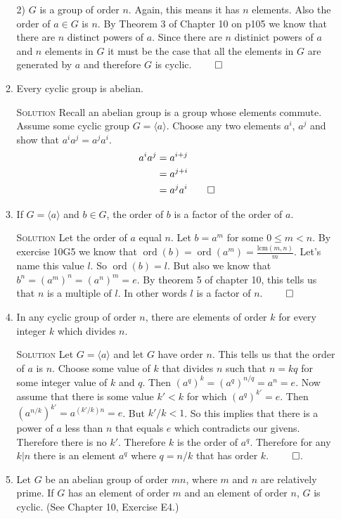 \documentclass[twoside]{amsart}
\newcommand{\solution}{\textsc{Solution}\xspace}
\newcommand{\blank}{\vspace{5pt}}
\newcommand{\itm}{\blank\item}
\newcommand{\sol}{\blank\noindent\solution}
\newcommand{\ord}{\mathop{\mathrm{ord}}}
\begin{document}
\begin{enumerate}[A.]
\begin{enumerate}[1)]
      2) $G$ is a group of order $n$. Again, this means it has $n$ elements.
      Also the order of $a \in G$ is $n$. By Theorem 3 of Chapter 10 on p105
      we know that there are $n$ distinct powers of $a$. Since there
      are $n$ distinict powers of $a$ and $n$ elements in $G$ it must be
      the case that all the elements in $G$ are generated by $a$ and
      therefore $G$ is cyclic. $\qed$

      \itm Every cyclic group is abelian.

      \sol Recall an abelian group is a group whose elements 
      commute. Assume some cyclic group $G = \langle a \rangle$. Choose
      any two elements $a^i$, $a^j$ and show that $a^i a^j = a^j a^i$.
      \begin{align*}
         a^i a^j &= a^{i+j} \\
                 &= a^{j+i} \\
                 &= a^j a^i \qed
      \end{align*}

      \itm If $G = \langle a \rangle$ and $b \in G$, the order of $b$
      is a factor of the order of $a$.

      \sol Let the order of $a$ equal $n$. Let $b=a^m$ for some $0 \le m < n$.
      By exercise 10G5 we know that $\ord(b) = \ord(a^m) =
      \frac{\mathrm{lcm}(m,n)}{m}$.  Let's name this value $l$.
      So $\ord(b)=l$. But also we know that $b^n = (a^m)^n = (a^n)^m = e$.
      By theorem 5 of chapter 10, this tells us that $n$ is a multiple of
      $l$. In other words $l$ is a factor of $n$. $\qed$

      \itm In any cyclic group of order $n$, there are elements of order $k$
      for every integer $k$ which divides $n$.

      \sol Let $G = \langle a \rangle$ and let $G$ have order $n$. 
      This tells us that the order of $a$ is $n$.
      Choose some value of $k$ that divides $n$ such that 
      $n = kq$ for some integer value of $k$ and $q$. Then
      $(a^q)^k = (a^q)^{n/q} = a^n = e$. Now assume that there
      is some value $k' < k$ for which $(a^q)^{k'} = e$. Then
      $(a^{n/k})^{k'} = a^{(k'/k)n} = e$. But $k'/k < 1$. So this implies
      that there is a power of $a$ less than $n$ that equals $e$ which
      contradicts our givens. Therefore there is no $k'$. Therefore
      $k$ is the order of $a^q$. Therefore for any $k | n$ there is
      an element $a^q$ where $q = n/k$ that has order $k$. $\qed$.

      \itm Let $G$ be an abelian group of order $mn$, where $m$ and $n$
      are relatively prime. If $G$ has an element of order $m$
      and an element of order $n$, $G$ is cyclic. (See Chapter 10,
      Exercise E4.)


\end{enumerate}
\end{enumerate}
\end{document}
